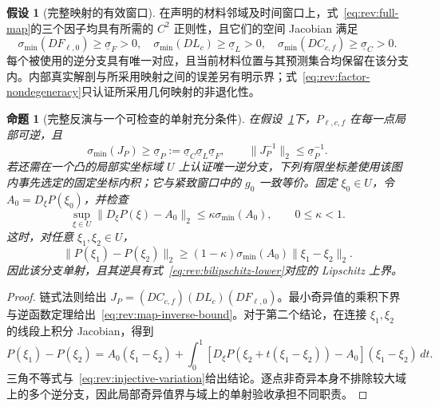 \documentclass[11pt,a4paper]{article}
\numberwithin{equation}{section}
\newtheorem{proposition}[theorem]{命题}
\theoremstyle{definition}
\newtheorem{assumption}[theorem]{假设}
\begin{document}
\begin{assumption}[完整映射的有效窗口]
\label{ass:rev:map-window}
在声明的材料邻域及时间窗口上，式~\eqref{eq:rev:full-map}的三个因子均具有所需的 $C^2$ 正则性，且它们的空间 Jacobian 满足
\begin{equation}
 \sigma_{\min}(DF_{\ell,0})\ge \underline\sigma_F>0,\quad
 \sigma_{\min}(DL_c)\ge \underline\sigma_L>0,\quad
 \sigma_{\min}(DC_{c,f})\ge \underline\sigma_C>0.
 \label{eq:rev:factor-nondegeneracy}
\end{equation}
每个被使用的逆分支具有唯一对应，且当前材料位置与其预测集合均保留在该分支内。内部真实解剖与所采用映射之间的误差另有明示界；式~\eqref{eq:rev:factor-nondegeneracy}只认证所采用几何映射的非退化性。
\end{assumption}

\begin{proposition}[完整反演与一个可检查的单射充分条件]
\label{prop:rev:map-inverse}
在假设~\ref{ass:rev:map-window}下，$P_{\ell,c,f}$ 在每一点局部可逆，且
\begin{equation}
 \sigma_{\min}(J_P)\ge
 \underline\sigma_P:=\underline\sigma_C\underline\sigma_L\underline\sigma_F,
 \qquad \|J_P^{-1}\|_2\le\underline\sigma_P^{-1}.
 \label{eq:rev:map-inverse-bound}
\end{equation}
若还需在一个凸的局部实坐标域 $U$ 上认证唯一逆分支，下列有限坐标差使用该图内事先选定的固定坐标内积；它与紧致窗口中的 $g_0$ 一致等价。固定 $\xi_0\in U$，令 $A_0=D_\xi P(\xi_0)$，并检查
\begin{equation}
 \sup_{\xi\in U}\|D_\xi P(\xi)-A_0\|_2
 \le\kappa\sigma_{\min}(A_0),\qquad 0\le\kappa<1.
 \label{eq:rev:injective-variation}
\end{equation}
这时，对任意 $\xi_1,\xi_2\in U$，
\begin{equation}
 \|P(\xi_1)-P(\xi_2)\|_2
 \ge(1-\kappa)\sigma_{\min}(A_0)\|\xi_1-\xi_2\|_2.
 \label{eq:rev:bilipschitz-lower}
\end{equation}
因此该分支单射，且其逆具有式~\eqref{eq:rev:bilipschitz-lower}对应的 Lipschitz 上界。
\end{proposition}
\begin{proof}
链式法则给出 $J_P=(DC_{c,f})(DL_c)(DF_{\ell,0})$。最小奇异值的乘积下界与逆函数定理给出~\eqref{eq:rev:map-inverse-bound}。对于第二个结论，在连接 $\xi_1,\xi_2$ 的线段上积分 Jacobian，得到
\[
 P(\xi_1)-P(\xi_2)=A_0(\xi_1-\xi_2)
 +\int_0^1[D_\xi P(\xi_2+t(\xi_1-\xi_2))-A_0](\xi_1-\xi_2)\,dt.
\]
三角不等式与~\eqref{eq:rev:injective-variation}给出结论。逐点非奇异本身不排除较大域上的多个逆分支，因此局部奇异值界与域上的单射验收承担不同职责。
\end{proof}
\end{document}
